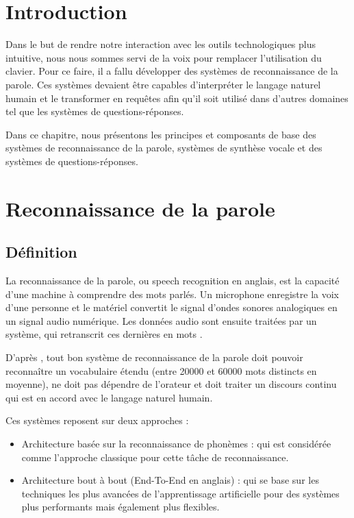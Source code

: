 \section{Introduction}
Dans le but de rendre notre interaction avec les outils technologiques plus intuitive, nous nous sommes servi de la voix pour remplacer l'utilisation du clavier.
Pour ce faire, il a fallu développer des systèmes de reconnaissance de la parole. Ces systèmes devaient être capables d'interpréter le langage naturel humain et le transformer en requêtes afin qu'il soit utilisé dans d'autres domaines tel que les systèmes de questions-réponses.

Dans ce chapitre, nous présentons les principes et composants de base des systèmes de reconnaissance de la parole, systèmes de synthèse vocale et des systèmes de questions-réponses.


\section{Reconnaissance de la parole}
\subsection{Définition}
La reconnaissance de la parole, ou speech recognition en anglais, est la capacité d'une machine à comprendre des mots parlés. Un microphone enregistre la voix d'une personne et le matériel convertit le signal d'ondes sonores analogiques en un signal audio numérique. Les données audio sont ensuite traitées par un système, qui retranscrit ces dernières en mots \cite{speechrecdef}.

D'après \cite{speechlangprocessing}, tout bon système de reconnaissance de la parole doit pouvoir reconnaître un vocabulaire étendu (entre 20000 et 60000 mots distincts en moyenne), ne doit pas dépendre de l'orateur et doit traiter un discours continu qui est en accord avec le langage naturel humain.

Ces systèmes reposent sur deux approches :
\begin{itemize}
    \item Architecture basée sur la reconnaissance de phonèmes : qui est considérée comme l'approche classique pour cette tâche de reconnaissance.
    \item Architecture bout à bout (End-To-End en anglais) : qui se base sur les techniques les plus avancées de l'apprentissage artificielle pour des systèmes plus performants mais également plus flexibles.\\
\end{itemize}

